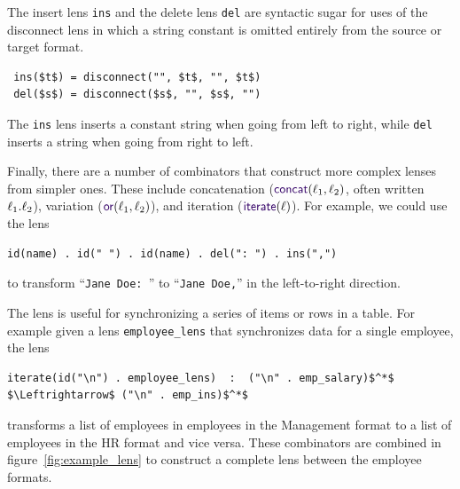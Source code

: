 \documentclass[12pt]{article}
\begin{document}
{The insert lens \lstinline{ins} and the delete lens \lstinline{del} are
syntactic sugar for uses of the disconnect lens in which a string
constant is omitted entirely from the source or target format.
\begin{lstlisting}
 ins($t$) = disconnect("", $t$, "", $t$)
 del($s$) = disconnect($s$, "", $s$, "")
\end{lstlisting}
The \lstinline{ins} lens inserts a constant string when going from
left to right, while \lstinline{del} inserts a string when going from right
to left.

Finally, there are a number of combinators that construct
more complex lenses from simpler ones. These include concatenation
($\ConcatLensOf{\Lens_1}{\Lens_2}$, often written $\mathit{\ell}_1 . \mathit{\ell}_2$), variation
($\OrLensOf{\Lens_1}{\Lens_2}$), and iteration ($\IterateLensOf{\Lens}$).
For example, we could use the lens
%
\begin{lstlisting}
id(name) . id(" ") . id(name) . del(": ") . ins(",")
\end{lstlisting}
%
to transform ``\lstinline{Jane Doe: }'' to ``\lstinline{Jane Doe,}'' in
the left-to-right direction.

%
%
The \IterateLens lens is useful for synchronizing a series of items or rows in a
table. For example given a
lens \lstinline{employee_lens} that synchronizes data for a single employee, the
lens
%
\begin{lstlisting}
iterate(id("\n") . employee_lens)  :  ("\n" . emp_salary)$^*$ $\Leftrightarrow$ ("\n" . emp_ins)$^*$
\end{lstlisting}
%
transforms a list of employees in employees in the Management format to a list
of employees in the HR format and vice versa. These combinators
are combined in figure~\ref{fig:example_lens} to construct a complete lens
between the employee formats.

}
\end{document}
